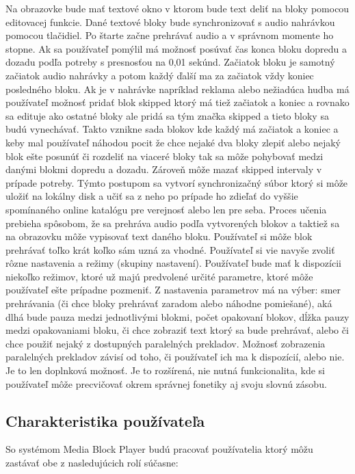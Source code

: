 \documentclass{article}
\begin{document}
Na obrazovke bude mať textové okno v ktorom bude text deliť na bloky pomocou editovacej funkcie. Dané textové bloky bude synchronizovať s audio nahrávkou pomocou tlačidiel. Po štarte začne prehrávať audio a v správnom momente ho stopne. Ak sa používateľ pomýlil má možnosť posúvať čas konca bloku dopredu a dozadu podľa potreby s presnosťou na 0,01 sekúnd. Začiatok bloku je samotný začiatok audio nahrávky a potom každý ďalší ma za začiatok vždy koniec posledného bloku. Ak je v nahrávke napríklad reklama alebo nežiadúca hudba má používateľ možnosť pridať blok skipped ktorý má tiež začiatok a koniec a rovnako sa edituje ako ostatné bloky ale pridá sa tým značka skipped a tieto bloky sa budú vynechávať. Takto vznikne sada blokov kde každý má začiatok a koniec a keby mal používateľ náhodou pocit že chce nejaké dva bloky zlepiť alebo nejaký blok ešte posunúť či rozdeliť na viaceré bloky tak sa môže pohybovať medzi danými blokmi dopredu a dozadu. Zároveň môže mazať skipped intervaly v prípade potreby. Týmto postupom sa vytvorí synchronizačný súbor ktorý si môže uložiť na lokálny disk a učiť sa z neho po prípade ho zdieľať do vyššie spomínaného online katalógu pre verejnosť alebo len pre seba. Proces učenia prebieha spôsobom, že sa prehráva audio podľa vytvorených blokov a taktiež sa na obrazovku môže vypisovať text daného bloku. Používateľ si môže blok prehrávať toľko krát koľko sám uzná za vhodné. Používateľ si vie navyše zvoliť rôzne nastavenia a režimy (skupiny nastavení). Používateľ bude mať k dispozícii niekoľko režimov, ktoré už majú predvolené určité parametre, ktoré môže používateľ ešte prípadne pozmeniť. Z nastavenia parametrov má na výber: smer prehrávania (či chce bloky prehrávať zaradom alebo náhodne pomiešané), aká dlhá bude pauza medzi jednotlivými blokmi, počet opakovaní blokov, dĺžka pauzy medzi opakovaniami bloku, či chce zobraziť text ktorý sa bude prehrávať, alebo či chce použiť nejaký z dostupných paralelných prekladov.  Možnosť zobrazenia paralelných prekladov závisí od toho, či používateľ ich ma k dispozícií, alebo nie. Je to len doplnková možnosť. Je to rozšírená, nie nutná funkcionalita, kde si používateľ môže precvičovať  okrem správnej fonetiky aj svoju slovnú zásobu.


\subsection{Charakteristika používateľa }
So systémom Media Block Player budú pracovať používatelia ktorý môžu zastávať obe z nasledujúcich rolí súčasne:
\end{document}
